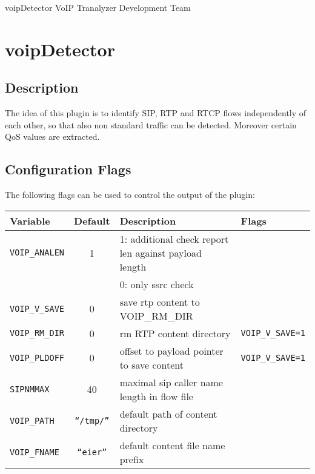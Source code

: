 \documentclass[documentation]{subfiles}
\begin{document}
\trantitle
    {voipDetector}
    {VoIP}
    {Tranalyzer Development Team}

\section{voipDetector}\label{s:voipDetector}

\subsection{Description}
The idea of this plugin is to identify SIP, RTP and RTCP flows independently of each other, so
that also non standard traffic can be detected. Moreover certain QoS values are extracted.

\subsection{Configuration Flags}
The following flags can be used to control the output of the plugin:

\begin{longtable}{lcll}
    \toprule
    {\bf Variable} & {\bf Default} & {\bf Description} & {\bf Flags}\\
    \midrule\endhead%
    {\tt VOIP\_ANALEN}  &  1 & 1: additional check report len against payload length\\
                        &    & 0: only ssrc check\\
    {\tt VOIP\_V\_SAVE} &  0 & save rtp content to VOIP\_RM\_DIR \\
    {\tt VOIP\_RM\_DIR} &  0 & rm RTP content directory & {\tt\small VOIP\_V\_SAVE=1}\\
    {\tt VOIP\_PLDOFF}  &  0 & offset to payload pointer to save content & {\tt\small VOIP\_V\_SAVE=1}\\
    {\tt SIPNMMAX}      & 40 & maximal sip caller name length in flow file \\
    {\tt VOIP\_PATH}  & {\tt\small ``/tmp/''} & default path of content directory \\
    {\tt VOIP\_FNAME} & {\tt\small ``eier''} & default content file name prefix \\
    \bottomrule
\end{longtable}

\end{document}
